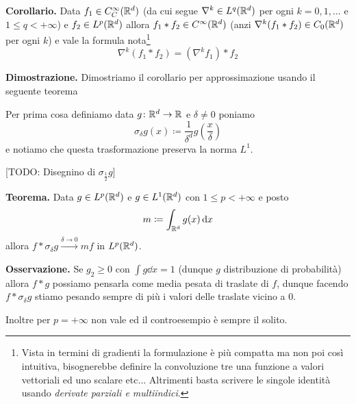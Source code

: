 \documentclass[a4paper, 12pt]{report}
\begin{document}
\textbf{Corollario.}
Data $f_1 \in C_C^\infty(\mathbb R^d)$ (da cui segue $\nabla^k \in L^q(\mathbb R^d)$ per ogni $k = 0, 1, \dots$ e $1 \leq q < +\infty$) e $f_2 \in L^p(\mathbb R^d)$ allora $f_1 \ast f_2 \in C^\infty(\mathbb R^d)$ (anzi $\nabla^k(f_1 \ast f_2) \in C_0(\mathbb R^d)$ per ogni $k$) e vale la formula nota\footnote{Vista in termini di gradienti la formulazione è più compatta ma non poi così intuitiva, bisognerebbe definire la convoluzione tre una funzione a valori vettoriali ed uno scalare etc... Altrimenti basta scrivere le singole identità usando \textit{derivate parziali e multiindici}.}
$$
\nabla^k (f_1 \ast f_2) = (\nabla^k f_1) \ast f_2
$$

\textbf{Dimostrazione.}
Dimostriamo il corollario per approssimazione usando il seguente teorema

Per prima cosa definiamo data $g \colon \mathbb R^d \to \mathbb R$ e $\delta \neq 0$ poniamo
$$
\sigma_\delta g(x) \coloneqq \frac{1}{\delta^d} g\left( \frac{x}{\delta} \right)
$$
e notiamo che questa trasformazione preserva la norma $L^1$.

[TODO: Disegnino di $\sigma_{\frac{1}{2}} g$]

\textbf{Teorema.}
Data $g \in L^p(\mathbb R^d)$ e $g \in L^1(\mathbb R^d)$ con $1 \leq p < +\infty$ e posto
$$
m \coloneqq \int_{\mathbb R^d} g(x) \,\mathrm{d} x
$$
allora $f \ast \sigma_\delta g \xrightarrow{\delta \to 0} m f$ in $L^p(\mathbb R^d)$.

\textbf{Osservazione.}
Se $g_2 \geq 0$ con $\int g \dd x = 1$ (dunque $g$ distribuzione di probabilità) allora $f \ast g$ possiamo pensarla come media pesata di traslate di $f$, dunque facendo $f \ast \sigma_\delta g$ stiamo pesando sempre di più i valori delle traslate vicino a $0$. 

Inoltre per $p = +\infty$ non vale ed il controesempio è sempre il solito.
\end{document}
